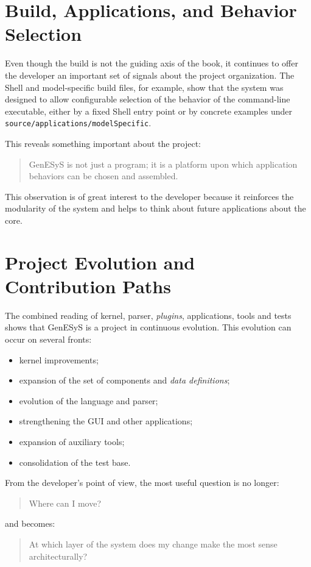 \section{Build, Applications, and Behavior Selection}
\label{sec:cap10_build_aplicacoes_selecao_comportamentos}

Even though the build is not the guiding axis of the book, it continues to offer the developer an important set of signals about the project organization. The Shell and model-specific build files, for example, show that the system was designed to allow configurable selection of the behavior of the command-line executable, either by a fixed Shell entry point or by concrete examples under \texttt{source/applications/modelSpecific}.

This reveals something important about the project:
\begin{quote}
 GenESyS is not just a program; it is a platform upon which application behaviors can be chosen and assembled.
\end{quote}

This observation is of great interest to the developer because it reinforces the modularity of the system and helps to think about future applications about the core.

\section{Project Evolution and Contribution Paths}
\label{sec:cap10_evolucao_projeto_caminhos_contribuicao}

The combined reading of kernel, parser, \textit{plugins}, applications, tools and tests shows that GenESyS is a project in continuous evolution. This evolution can occur on several fronts:
\begin{itemize}
 \item kernel improvements;
 \item expansion of the set of components and \textit{data definitions};
 \item evolution of the language and parser;
 \item strengthening the GUI and other applications;
 \item expansion of auxiliary tools;
 \item consolidation of the test base.
\end{itemize}

From the developer's point of view, the most useful question is no longer:
\begin{quote}
 Where can I move?
\end{quote}
and becomes:
\begin{quote}
 At which layer of the system does my change make the most sense architecturally?
\end{quote}

